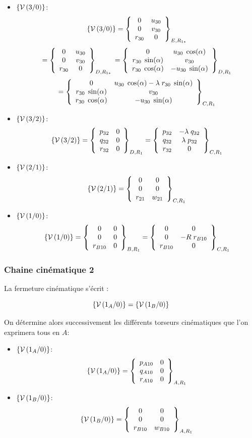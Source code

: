 \documentclass[10pt,fleqn]{article} %
\begin{document}
		\begin{itemize}
\item \textbf{$\torseurcin{V}{3}{0}$}:\\
$$
\torseurcin{V}{3}{0}	
=	\torseurcol{0}{0}{r_{30}}{u_{30}}{v_{30}}{0}{E,R_{1*}}
$$
$$
=	\torseurcol{0}{0}{{r}_{30}}{u_{30}}{v_{30}}{0}{D,R_{1*}}\\
=	\torseurcol{0}{r_{30}\;\sin(\alpha)}{r_{30}\;\cos(\alpha)}{u_{30}\;\cos(\alpha)}{v_{30}}{-u_{30}\;\sin(\alpha)}{D,R_{1}}
$$
$$
=\torseurcol{0}{r_{30}\;\sin(\alpha)}{r_{30}\;\cos(\alpha)}{u_{30}\;\cos(\alpha)-\lambda\;r_{30}\;\sin(\alpha)}{v_{30}}{-u_{30}\;\sin(\alpha)}{C,R_{1}}
$$
\item \textbf{$\torseurcin{V}{3}{2}$}:\\
$$
\torseurcin{V}{3}{2}	
=	\torseurcol{p_{32}}{q_{32}}{r_{32}}{0}{0}{0}{D,R_{1}}
=	\torseurcol{p_{32}}{q_{32}}{r_{32}}{-\lambda\;q_{32}}{\lambda\;p_{32}}{0}{C,R_{1}}
$$
\item \textbf{$\torseurcin{V}{2}{1}$}:\\
$$
\torseurcin{V}{2}{1}	
=	\torseurcol{0}{0}{r_{21}}{0}{0}{w_{21}}{C,R_{1}}
$$
\item \textbf{$\torseurcin{V}{1}{0}$}:\\
$$
\torseurcin{V}{1}{0}	
=	\torseurcol{0}{0}{r_{B10}}{0}{0}{0}{B,R_{1}}
=	\torseurcol{0}{0}{r_{B10}}{0}{-R\;r_{B10}}{0}{C,R_{1}}
$$
\end{itemize}
		


\subsubsection{Chaine cinématique 2}
La fermeture cinématique s'écrit :

		$$\torseurcin{V}{1_A}{0}=	\torseurcin{V}{1_B}{0}$$
		
		On détermine alors successivement les différents torseurs cinématiques que l'on exprimera tous en $A$:

		\begin{itemize}
\item \textbf{$\torseurcin{V}{1_A}{0}$}:\\
$$
\torseurcin{V}{1_A}{0}	
=	\torseurcol{p_{A10}}{q_{A10}}{r_{A10}}{0}{0}{0}{A,R_{1}}
$$
\item \textbf{$\torseurcin{V}{1_B}{0}$}:\\
$$
\torseurcin{V}{1_B}{0}
=	\torseurcol{0}{0}{r_{B10}}{0}{0}{w_{B10}}{A,R_{1}}
$$

\end{itemize}
\end{document}
